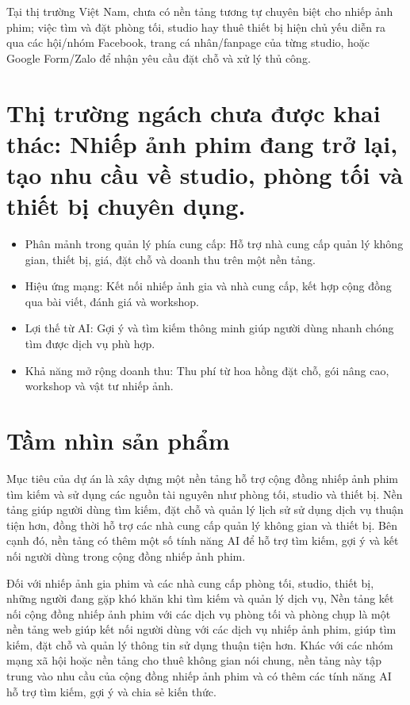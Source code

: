 Tại thị trường Việt Nam, chưa có nền tảng tương tự chuyên biệt cho nhiếp ảnh phim; việc tìm và đặt phòng tối, studio hay thuê thiết bị hiện chủ yếu diễn ra qua các hội/nhóm Facebook, trang cá nhân/fanpage của từng studio, hoặc Google Form/Zalo để nhận yêu cầu đặt chỗ và xử lý thủ công.

\section{Thị trường ngách chưa được khai thác: Nhiếp ảnh phim đang trở lại, tạo nhu cầu về studio, phòng tối và thiết bị chuyên dụng.}

\begin{itemize}
	\item Phân mảnh trong quản lý phía cung cấp: Hỗ trợ nhà cung cấp quản lý không gian, thiết bị, giá, đặt chỗ và doanh thu trên một nền tảng.
	\item Hiệu ứng mạng: Kết nối nhiếp ảnh gia và nhà cung cấp, kết hợp cộng đồng qua bài viết, đánh giá và workshop.
	\item Lợi thế từ AI: Gợi ý và tìm kiếm thông minh giúp người dùng nhanh chóng tìm được dịch vụ phù hợp.
	\item Khả năng mở rộng doanh thu: Thu phí từ hoa hồng đặt chỗ, gói nâng cao, workshop và vật tư nhiếp ảnh.
\end{itemize}


\section{Tầm nhìn sản phẩm}

Mục tiêu của dự án là xây dựng một nền tảng hỗ trợ cộng đồng nhiếp ảnh phim tìm kiếm và sử dụng các nguồn tài nguyên như phòng tối, studio và thiết bị. Nền tảng giúp người dùng tìm kiếm, đặt chỗ và quản lý lịch sử sử dụng dịch vụ thuận tiện hơn, đồng thời hỗ trợ các nhà cung cấp quản lý không gian và thiết bị. Bên cạnh đó, nền tảng có thêm một số tính năng AI để hỗ trợ tìm kiếm, gợi ý và kết nối người dùng trong cộng đồng nhiếp ảnh phim.

Đối với nhiếp ảnh gia phim và các nhà cung cấp phòng tối, studio, thiết bị, những người đang gặp khó khăn khi tìm kiếm và quản lý dịch vụ, Nền tảng kết nối cộng đồng nhiếp ảnh phim với các dịch vụ phòng tối và phòng chụp là một nền tảng web giúp kết nối người dùng với các dịch vụ nhiếp ảnh phim, giúp tìm kiếm, đặt chỗ và quản lý thông tin sử dụng thuận tiện hơn. Khác với các nhóm mạng xã hội hoặc nền tảng cho thuê không gian nói chung, nền tảng này tập trung vào nhu cầu của cộng đồng nhiếp ảnh phim và có thêm các tính năng AI hỗ trợ tìm kiếm, gợi ý và chia sẻ kiến thức.

